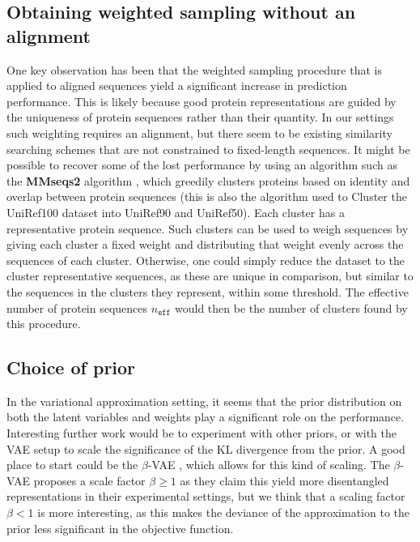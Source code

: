 \subsection{Obtaining weighted sampling without an alignment}
One key observation has been that the weighted sampling procedure that is applied to aligned sequences yield a significant increase in prediction performance. This is likely because good protein representations are guided by the uniqueness of protein sequences rather than their quantity. In our settings such weighting requires an alignment, but there seem to be existing similarity searching schemes that are not constrained to fixed-length sequences. It might be possible to recover some of the lost performance by using an algorithm such as the \textbf{MMseqs2} algorithm \cite{steinegger2018clustering}, which greedily clusters proteins based on identity and overlap between protein sequences (this is also the algorithm used to Cluster the UniRef100 dataset into UniRef90 and UniRef50). Each cluster has a representative protein sequence. Such clusters can be used to weigh sequences by giving each cluster a fixed weight and distributing that weight evenly across the sequences of each cluster. Otherwise, one could simply reduce the dataset to the cluster representative  sequences, as these are unique in comparison, but similar to the sequences in the clusters they represent, within some threshold. The effective number of protein sequences $n_{\texttt{eff}}$ would then be the number of clusters found by this procedure.


\subsection{Choice of prior}
In the variational approximation setting, it seems that the prior distribution on both the latent variables and weights play a significant role on the performance. Interesting further work would be to experiment with other priors, or with the VAE setup to scale the significance of the KL divergence from the prior. A good place to start could be the $\beta$-VAE \cite{higgins2017beta}, which allows for this kind of scaling. The $\beta$-VAE proposes a scale factor $\beta \geq 1$ as they claim this yield more disentangled representations in their experimental settings, but we think that a scaling factor $\beta < 1$ is more interesting, as this makes the deviance of the approximation to the prior less significant in the objective function.

